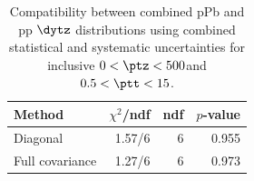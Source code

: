 \begin{table}[htp!]
\centering
\begin{tabular}{|l|r|r|r|}
\hline
Method & $\chi^2$/ndf & ndf & $p$-value \\
\hline
Diagonal & 1.57/6 & 6 & 0.955 \\
Full covariance & 1.27/6 & 6 & 0.973 \\
\hline
\end{tabular}
\caption{Compatibility between combined pPb and pp $\dytz$ distributions using combined statistical and systematic uncertainties for inclusive $0 < \ptz < 500$\GeV and $0.5 < \ptt < 15$\GeV.}
\label{table:chisq_deta}
\end{table}
